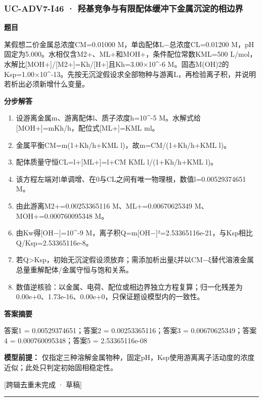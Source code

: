 \documentclass[UTF8,11pt,a4paper]{ctexart}
\begin{document}
\subsubsection*{UC-ADV7-I46 · 羟基竞争与有限配体缓冲下金属沉淀的相边界}
\noindent\textbf{题目}\par
某假想二价金属总浓度CM=0.01000 M，单齿配体L−总浓度CL=0.01200 M，pH固定为5.000。水相仅含M2+、ML+和MOH+，条件配位常数KML=500 L/mol，水解比[MOH+]/[M2+]=Kh/[H+]且Kh=3.00×10\textasciicircum{}-6 M。固态M(OH)2的Ksp=1.00×10\textasciicircum{}-13。先按无沉淀假设求全部物种与游离L，再检验离子积，并说明若析出必须新增什么变量。\par
\medskip\noindent\textbf{分步解答}
\begin{enumerate}
\item 设游离金属m、游离配体l、质子浓度h=10\textasciicircum{}-5 M。水解式给[MOH+]=mKh/h，配位式[ML+]=KML ml。
\item 金属平衡CM=m(1+Kh/h+KML l)，故m=CM/(1+Kh/h+KML l)。
\item 配体质量守恒CL=l+[ML+]=l+CM KML l/(1+Kh/h+KML l)。
\item 该方程左端对l单调增、在0与CL之间有唯一物理根，数值l=0.00529374651 M。
\item 由此游离M2+=0.00253365116 M、ML+=0.00670625349 M、MOH+=0.000760095348 M。
\item 由Kw得[OH−]=10\textasciicircum{}-9 M，离子积Q=m[OH−]²=2.53365116e-21，与Ksp相比Q/Ksp=2.53365116e-8。
\item 若Q>Ksp，初始无沉淀假设须放弃；需添加析出量ξ并以CM−ξ替代溶液金属总量重解配体/金属守恒与饱和关系。
\item 数值逆核验：以金属、电荷、配位或相边界独立方程复算；归一化残差为0.00e+0、1.73e-16、0.00e+0，只保证题设模型内的一致性。
\end{enumerate}
\noindent\textbf{答案摘要}\par
答案1 = 0.00529374651；答案2 = 0.00253365116；答案3 = 0.00670625349；答案4 = 0.000760095348；答案5 = 2.53365116e-08\par
\noindent\textbf{模型前提：}
仅指定三种溶解金属物种，固定pH，Ksp使用游离离子活动度的浓度近似；此处只判定初始固相稳定性。\par
\noindent\textcolor{red!65!black}{[跨辑去重未完成 · 草稿]} \par
\medskip\hrule\medskip
{}
\end{document}
